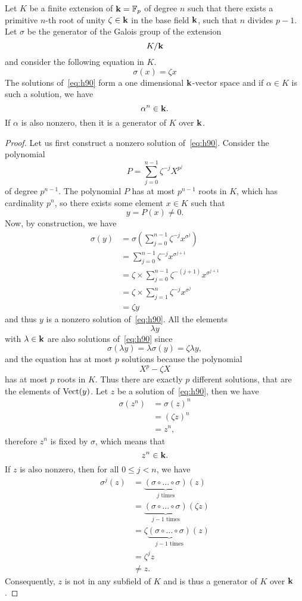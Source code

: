 \begin{prop}
  \label{prop:h90}
  Let $K$ be a finite extension of $\mathbf{k}=\mathbb{F}_p$ of degree $n$ such that there exists a
primitive $n$-th root of unity $\zeta\in\mathbf{k}$ in the base field $\mathbf{k}$, \ie such
that $n$ divides $p-1$. 
 Let $\sigma$ be the generator of the Galois group of the extension
 \[
   K/\mathbf{k}
 \]
 and consider the following equation in $K$.
 \begin{equation}
   \tag{H90}
   \sigma(x) = \zeta x
   \label{eq:h90}
 \end{equation}
The solutions of~\eqref{eq:h90} form a one dimensional $\mathbf{k}$-vector space and if
$\alpha\in K$ is such a solution, we have
\[
  \alpha^n\in\mathbf{k}.
\]
If $\alpha$ is also nonzero, then it is a generator of $K$ over $\mathbf{k}$.
\end{prop}
\begin{proof}
  Let us first construct a nonzero solution of~\eqref{eq:h90}. Consider the polynomial
  \[
    P = \sum_{j=0}^{n-1}\zeta^{-j} X^{p^j}
  \]
  of degree $p^{n-1}$. The polynomial $P$ has at most $p^{n-1}$ roots in $K$,
  which has cardinality $p^n$, so there exists some element $x\in K$ such that
  \[
    y = P(x)\neq0.
  \]
  Now, by construction, we have
  \begin{align*}
    \sigma(y) &= \sigma(\sum_{j=0}^{n-1}\zeta^{-j}x^{\sigma^{j}})\\
    &= \sum_{j=0}^{n-1}\zeta^{-j}x^{\sigma^{j+1}}\\
    &= \zeta \times \sum_{j=0}^{n-1}\zeta^{-(j+1)}x^{\sigma^{j+1}}\\
    &= \zeta \times \sum_{j=1}^{n}\zeta^{-j}x^{\sigma^{j}}\\
    &= \zeta y
  \end{align*}
  and thus $y$ is a nonzero solution of~\eqref{eq:h90}. All the elements
  \[
    \lambda y
  \]
  with $\lambda\in\mathbf{k}$ are also solutions of~\eqref{eq:h90} since
  \[
    \sigma(\lambda y) = \lambda\sigma(y) = \zeta\lambda y,
  \]
  and the equation has at most $p$ solutions because the polynomial
  \[
    X^p - \zeta X
  \]
  has at most $p$ roots in $K$. Thus there are exactly $p$ different solutions,
  that are the elements of $\operatorname{Vect}(y)$. Let $z$ be a solution of~\eqref{eq:h90},
  then we have
  \begin{align*}
   \sigma(z^n) &= \sigma(z)^n\\
   &= (\zeta z)^n\\
   &= z^n,
  \end{align*}
  therefore $z^n$ is fixed by $\sigma$, which means that
  \[
    z^n\in\mathbf{k}.
  \]
  If $z$ is also nonzero, then for all $0\leq j<n$, we have
  \begin{align*}
    \sigma^j(z) &= \underbrace{(\sigma\circ\dots\circ\sigma)}_{j\text{ times}}(z)\\
    &= \underbrace{(\sigma\circ\dots\circ\sigma)}_{j-1\text{ times}}(\zeta z)\\
    &= \zeta\underbrace{(\sigma\circ\dots\circ\sigma)}_{j-1\text{ times}}(z)\\
    &= \zeta^j z\\
    &\neq z.
  \end{align*}
  Consequently, $z$ is not in any subfield of $K$ and is thus a generator of $K$
  over $\mathbf{k}$.
\end{proof}
